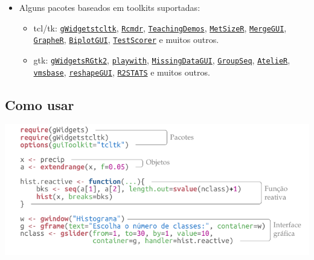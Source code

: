 \begin{frame}

  \begin{itemize}
  \item Alguns pacotes baseados em toolkits suportadas:
    \begin{itemize}
    \item tcl/tk:
      \href{http://cran.r-project.org/web/packages/gWidgetstcltk/index.html}{\texttt{gWidgetstcltk}},
      \href{http://cran.r-project.org/web/packages/Rcmdr/index.html}{\texttt{Rcmdr}},
      \href{http://cran.r-project.org/web/packages/TeachingDemos/index.html}{\texttt{TeachingDemos}},
      \href{http://cran.r-project.org/web/packages/MetSizeR/index.html}{\texttt{MetSizeR}},
      \href{http://cran.r-project.org/web/packages/MergeGUI/index.html}{\texttt{MergeGUI}},
      \href{http://cran.r-project.org/web/packages/GrapheR/index.html}{\texttt{GrapheR}},
      \href{http://cran.r-project.org/web/packages/BiplotGUI/index.html}{\texttt{BiplotGUI}},
      \href{http://cran.r-project.org/web/packages/TestScorer/index.html}{\texttt{TestScorer}}
      e muitos outros.
    \item gtk:
      \href{http://cran.r-project.org/web/packages/gWidgetsRGtk2/index.html}{\texttt{gWidgetsRGtk2}},
      \href{http://cran.r-project.org/web/packages/playwith/index.html}{\texttt{playwith}},
      \href{http://cran.r-project.org/web/packages/MissingDataGUI/index.html}{\texttt{MissingDataGUI}},
      \href{http://cran.r-project.org/web/packages/GroupSeq/index.html}{\texttt{GroupSeq}},
      \href{http://cran.r-project.org/web/packages/AtelieR/index.html}{\texttt{AtelieR}},
      \href{http://cran.r-project.org/web/packages/vmsbase/index.html}{\texttt{vmsbase}},
      \href{http://cran.r-project.org/web/packages/reshapeGUI/index.html}{\texttt{reshapeGUI}},
      \href{http://cran.r-project.org/web/packages/R2STATS/index.html}{\texttt{R2STATS}}
      e muitos outros.
  \end{itemize}
\end{itemize}

\end{frame}


\subsection*{Como usar}

\begin{frame}
\includegraphics[scale=1]{./tikz/hist_slider_gWidgets-1.pdf}
\end{frame}

